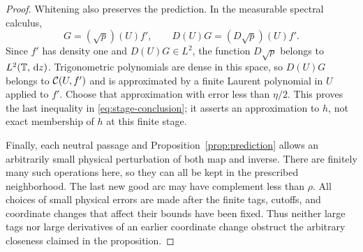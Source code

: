 \begin{proof}
Whitening also preserves the prediction.  In the measurable spectral
calculus,
\[
 G=(\sqrt p)(U)f',\qquad
 D(U)G=(D\sqrt p)(U)f'.
\]
Since $f'$ has density one and $D(U)G\in L^2$, the function
$D\sqrt p$ belongs to $L^2(\mathbb T,\,\mathrm d z)$.  Trigonometric polynomials are
dense in this space, so $D(U)G$ belongs to $\mathcal C(U,f')$ and is
approximated by a finite Laurent polynomial in $U$ applied to $f'$.
Choose that approximation with error less than $\eta/2$.  This proves
the last inequality in \eqref{eq:stage-conclusion}; it asserts an
approximation to $h$, not exact membership of $h$ at this finite stage.

Finally, each neutral passage and Proposition~\ref{prop:prediction}
allows an arbitrarily small physical perturbation of both map and
inverse.  There are finitely many such operations here, so they can
all be kept in the prescribed neighborhood.  The last new good arc
may have complement less than $\rho$.  All choices of small physical
errors are made after the finite tags, cutoffs, and coordinate changes
that affect their bounds have been fixed.  Thus neither large tags nor
large derivatives of an earlier coordinate change obstruct the
arbitrary closeness claimed in the proposition.
\end{proof}

